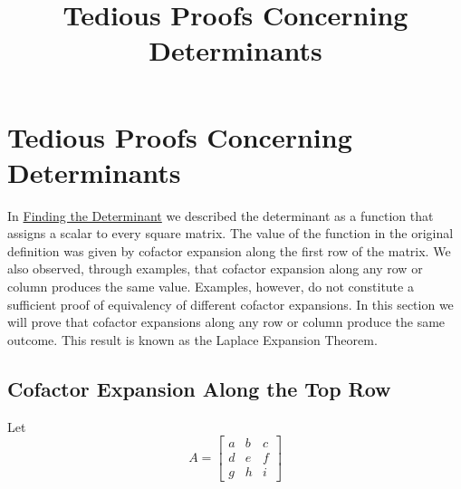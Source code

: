\documentclass{ximera}
\title{Tedious Proofs Concerning Determinants} \license{CC BY-NC-SA 4.0}
\begin{document}
\begin{abstract}

\end{abstract}
\maketitle


\section*{Tedious Proofs Concerning Determinants}
In \href{https://ximera.osu.edu/oerlinalg/LinearAlgebra/DET-0010/main}{Finding the Determinant} we described the determinant as a function that assigns a scalar to every square matrix.  The value of the function in the original definition was given by cofactor expansion along the first row of the matrix.  We also observed, through examples, that cofactor expansion along any row or column produces the same value.  Examples, however, do not constitute a sufficient proof of equivalency of different cofactor expansions.  In this section we will prove that cofactor expansions along any row or column produce the same outcome.  This result is known as the Laplace Expansion Theorem. 

\subsection*{Cofactor Expansion Along the Top Row}
Let 
$$A=\begin{bmatrix}a&b&c\\d&e&f\\g&h&i\end{bmatrix}$$
\end{document}
